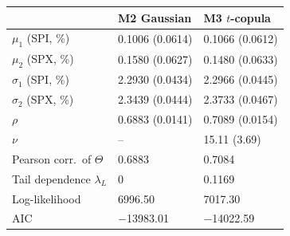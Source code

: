 \begin{tabular}{lll}
\toprule
 & M2 Gaussian & M3 $t$-copula \\
\midrule
$\mu_1$ (SPI, \%) & 0.1006 (0.0614) & 0.1066 (0.0612) \\
$\mu_2$ (SPX, \%) & 0.1580 (0.0627) & 0.1480 (0.0633) \\
$\sigma_1$ (SPI, \%) & 2.2930 (0.0434) & 2.2966 (0.0445) \\
$\sigma_2$ (SPX, \%) & 2.3439 (0.0444) & 2.3733 (0.0467) \\
$\rho$ & 0.6883 (0.0141) & 0.7089 (0.0154) \\
$\nu$ & -- & 15.11 (3.69) \\
Pearson corr.\ of $\Theta$ & 0.6883 & 0.7084 \\
Tail dependence $\lambda_L$ & 0 & 0.1169 \\
Log-likelihood & 6996.50 & 7017.30 \\
AIC & $-$13983.01 & $-$14022.59 \\
\bottomrule
\end{tabular}
